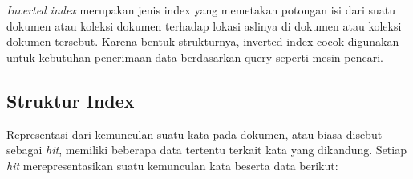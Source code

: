 \emph{Inverted index} merupakan jenis index yang memetakan potongan isi dari
suatu dokumen atau koleksi dokumen terhadap lokasi aslinya di dokumen atau
koleksi dokumen tersebut. Karena bentuk strukturnya, inverted index cocok
digunakan untuk kebutuhan penerimaan data berdasarkan query seperti mesin
pencari.



%
%

\subsection{Struktur Index}

Representasi dari kemunculan suatu kata pada dokumen, atau biasa disebut sebagai
\emph{hit}, memiliki beberapa data tertentu terkait kata yang dikandung. Setiap
\emph{hit} merepresentasikan suatu kemunculan kata beserta data berikut:

